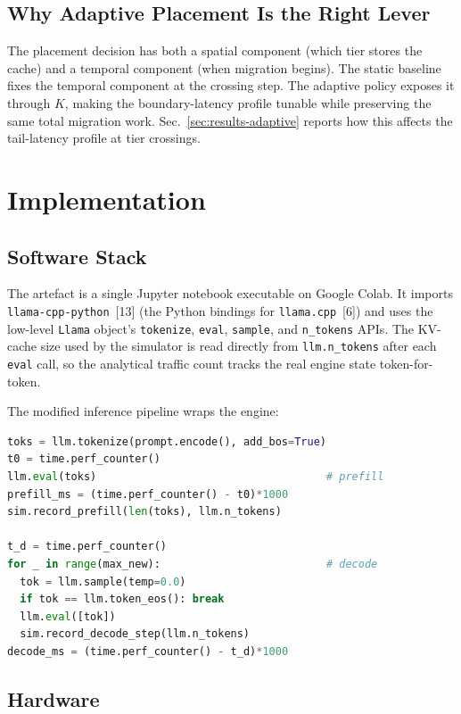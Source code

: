 \documentclass[conference]{IEEEtran}
\begin{document}
\subsection{Why Adaptive Placement Is the Right Lever}

The placement decision has both a spatial component (which tier stores the cache) and a temporal component (when migration begins). The static baseline fixes the temporal component at the crossing step. The adaptive policy exposes it through $K$, making the boundary-latency profile tunable while preserving the same total migration work. Sec.~\ref{sec:results-adaptive} reports how this affects the tail-latency profile at tier crossings.

\section{Implementation}
\label{sec:impl}

\subsection{Software Stack}

The artefact is a single Jupyter notebook executable on Google Colab. It imports \texttt{llama-cpp-python}~[13] (the Python bindings for \texttt{llama.cpp}~[6]) and uses the low-level \texttt{Llama} object's \texttt{tokenize}, \texttt{eval}, \texttt{sample}, and \texttt{n\_tokens} APIs. The KV-cache size used by the simulator is read directly from \texttt{llm.n\_tokens} after each \texttt{eval} call, so the analytical traffic count tracks the real engine state token-for-token.

The modified inference pipeline wraps the engine:
\begin{lstlisting}[language=Python]
toks = llm.tokenize(prompt.encode(), add_bos=True)
t0 = time.perf_counter()
llm.eval(toks)                                    # prefill
prefill_ms = (time.perf_counter() - t0)*1000
sim.record_prefill(len(toks), llm.n_tokens)

t_d = time.perf_counter()
for _ in range(max_new):                          # decode
  tok = llm.sample(temp=0.0)
  if tok == llm.token_eos(): break
  llm.eval([tok])
  sim.record_decode_step(llm.n_tokens)
decode_ms = (time.perf_counter() - t_d)*1000
\end{lstlisting}

\subsection{Hardware}
\end{document}
